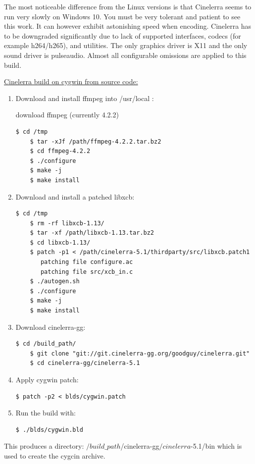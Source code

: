 The most noticeable difference from the Linux versions is that Cinelerra seems to run 
very slowly on Windows 10. You must be very tolerant and patient to see this work.  
It can however exhibit astonishing speed when encoding.  Cinelerra has to be downgraded significantly due to lack of supported interfaces, codecs (for example h264/h265), and utilities.  
The only graphics driver is X11 and the only sound driver is pulseaudio.  Almost all configurable
omissions are applied to this build.  

\underline{Cinelerra build on cygwin from source code:}

\begin{enumerate}
	\item Download and install ffmpeg into /usr/local :

   	download ffmpeg (currently 4.2.2)
\begin{lstlisting}[numbers=none]
	$ cd /tmp
	$ tar -xJf /path/ffmpeg-4.2.2.tar.bz2
	$ cd ffmpeg-4.2.2
	$ ./configure
	$ make -j
	$ make install
\end{lstlisting}
	\item Download and install a patched libxcb:
\begin{lstlisting}[numbers=none]
	$ cd /tmp
	$ rm -rf libxcb-1.13/
	$ tar -xf /path/libxcb-1.13.tar.bz2
	$ cd libxcb-1.13/
	$ patch -p1 < /path/cinelerra-5.1/thirdparty/src/libxcb.patch1
	   patching file configure.ac
	   patching file src/xcb_in.c
	$ ./autogen.sh
	$ ./configure
	$ make -j
	$ make install
\end{lstlisting}
	\item Download cinelerra-gg:
\begin{lstlisting}[numbers=none]
	$ cd /build_path/
	$ git clone "git://git.cinelerra-gg.org/goodguy/cinelerra.git"
	$ cd cinelerra-gg/cinelerra-5.1
\end{lstlisting}
	\item Apply cygwin patch:
\begin{lstlisting}[numbers=none]
	$ patch -p2 < blds/cygwin.patch
\end{lstlisting}
	\item Run the build with:
\begin{lstlisting}[numbers=none]
	$ ./blds/cygwin.bld
\end{lstlisting}
\end{enumerate}

This produces a directory: $/build\_path$/cinelerra-gg$/cinelerra$-5.1/bin \newline
which is used to create the cygcin archive.

